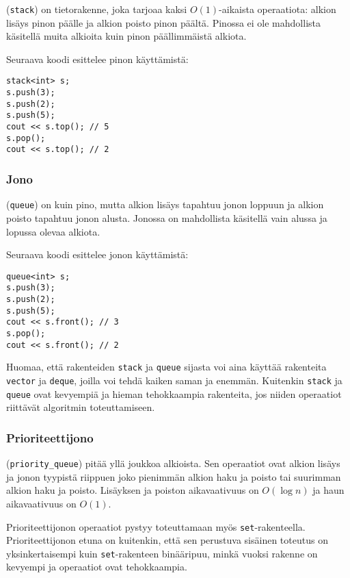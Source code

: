 
 (\texttt{stack}) on tietorakenne,
joka tarjoaa kaksi $O(1)$-aikaista
operaatiota:
alkion lisäys pinon päälle ja alkion
poisto pinon päältä.
Pinossa ei ole mahdollista käsitellä muita
alkioita kuin pinon päällimmäistä alkiota.

Seuraava koodi esittelee pinon käyttämistä:

\begin{lstlisting}
stack<int> s;
s.push(3);
s.push(2);
s.push(5);
cout << s.top(); // 5
s.pop();
cout << s.top(); // 2
\end{lstlisting}
\subsubsection{Jono}


 (\texttt{queue}) on kuin pino,
mutta alkion lisäys tapahtuu jonon loppuun
ja alkion poisto tapahtuu jonon alusta.
Jonossa on mahdollista käsitellä vain
alussa ja lopussa olevaa alkiota.

Seuraava koodi esittelee jonon käyttämistä:

\begin{lstlisting}
queue<int> s;
s.push(3);
s.push(2);
s.push(5);
cout << s.front(); // 3
s.pop();
cout << s.front(); // 2
\end{lstlisting}

Huomaa, että rakenteiden \texttt{stack} ja \texttt{queue}
sijasta voi aina käyttää rakenteita
\texttt{vector} ja \texttt{deque}, joilla voi
tehdä kaiken saman ja enemmän.
Kuitenkin \texttt{stack} ja \texttt{queue} ovat
kevyempiä ja hieman tehokkaampia rakenteita,
jos niiden operaatiot riittävät algoritmin toteuttamiseen.

\subsubsection{Prioriteettijono}


 (\texttt{priority\_queue})
pitää yllä joukkoa alkioista.
Sen operaatiot ovat alkion lisäys ja
jonon tyypistä riippuen joko
pienimmän alkion haku ja poisto tai
suurimman alkion haku ja poisto.
Lisäyksen ja poiston aikavaativuus on $O(\log n)$
ja haun aikavaativuus on $O(1)$.

Prioriteettijonon operaatiot
pystyy toteuttamaan myös \texttt{set}-rakenteella.
Prioriteettijonon etuna on kuitenkin,
että sen  perustuva sisäinen
toteutus on yksinkertaisempi
kuin \texttt{set}-rakenteen binääripuu,
minkä vuoksi rakenne on kevyempi ja
operaatiot ovat tehokkaampia.

